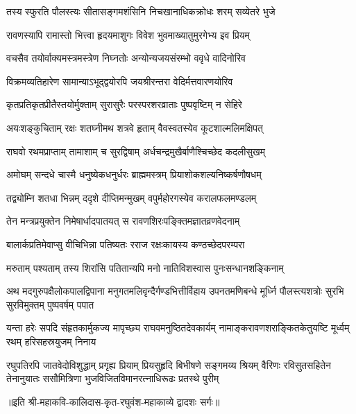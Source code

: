 \twolineshloka
{तस्य स्फुरति पौलस्त्यः सीतासङ्गमशंसिनि}
{निचखानाधिकक्रोधः शरम् सव्येतरे भुजे} %

\twolineshloka
{रावणस्यापि रामास्तो भित्त्वा हृदयमाशुगः}
{विवेश भुवमाख्यातुमुरगेभ्य इव प्रियम्} %

\twolineshloka
{वचसैव तयोर्वाक्यमस्त्रमस्त्रेण निघ्नतोः}
{अन्योन्यजयसंरम्भो ववृधे वादिनोरिव} %

\twolineshloka
{विक्रमव्यतिहारेण सामान्याऽभूद्द्वयोरपि}
{जयश्रीरन्तरा वेदिर्मत्तवारणयोरिव} %

\twolineshloka
{कृतप्रतिकृतप्रीतैस्तयोर्मुक्ताम् सुरासुरैः}
{परस्परशरव्राताः पुष्पवृष्टिम् न सेहिरे} %

\twolineshloka
{अयःशङ्कुचिताम् रक्षः शतघ्नीमथ शत्रवे}
{हृताम् वैवस्वतस्येव कूटशाल्मलिमक्षिपत्} %

\twolineshloka
{राघवो रथमप्राप्ताम् तामाशाम् च सुरद्विषाम्}
{अर्धचन्द्रमुखैर्बाणैश्चिच्छेद कदलीसुखम्} %

\twolineshloka
{अमोघम् सन्दधे चास्मै धनुष्येकधनुर्धरः}
{ब्राह्ममस्त्रम् प्रियाशोकशल्यनिष्कर्षणौषधम्} %

\twolineshloka
{तद्व्योम्नि शतधा भिन्नम् ददृशे दीप्तिमन्मुखम्}
{वपुर्महोरगस्येव करालफलमण्डलम्} %

\twolineshloka
{तेन मन्त्रप्रयुक्तेन निमेषार्धादपातयत्}
{स रावणशिरःपङ्क्तिमज्ञातव्रणवेदनाम्} %

\twolineshloka
{बालार्कप्रतिमेवाप्सु वीचिभिन्ना पतिष्यतः}
{रराज रक्षःकायस्य कण्ठच्छेदपरम्परा} %

\twolineshloka
{मरुताम् पश्यताम् तस्य शिरांसि पतितान्यपि}
{मनो नातिविशस्वास पुनःसन्धानशङ्किनाम्} %

\fourlineindentedshloka
{अथ मदगुरुपक्षैलोकपालद्विपाना}
{मनुगतमलिवृन्दैर्गण्डभित्तीर्विहाय}
{उपनतमणिबन्धे मूर्ध्नि पौलस्त्यशत्रोः}
{सुरभि सुरविमुक्तम् पुष्पवर्षम् पपात} %

\fourlineindentedshloka
{यन्ता हरेः सपदि संहृतकार्मुकज्य}
{मापृच्छ्य राघवमनुष्ठितदेवकार्यम्}
{नामाङ्करावणशराङ्कितकेतुयष्टि}
{मूर्ध्वम् रथम् हरिसहस्रयुजम् निनाय} %

\fourlineindentedshloka
{रघुपतिरपि जातवेदोविशुद्धाम् प्रगृह्य प्रियाम्}
{प्रियसुहृदि बिभीषणे सङ्गमय्य श्रियम् वैरिणः}
{रविसुतसहितेन तेनानुयातः ससौमित्रिणा}
{भुजविजितविमानरत्नाधिरूढः प्रतस्थे पुरीम्} %

॥इति श्री-महाकवि-कालिदास-कृत-रघुवंश-महाकाव्ये द्वादशः सर्गः॥
